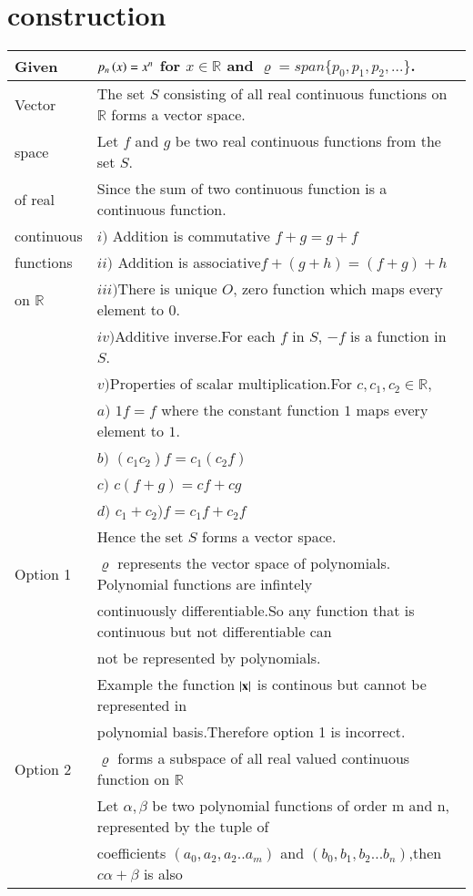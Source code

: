 \documentclass[journal,12pt]{IEEEtran}
\begin{document}
\section{construction}
\renewcommand{\thetable}{1}
\begin{longtable}{|l|l|}
    \hline
    Given & $p_n\left(x\right)=x^n$ for $x\in\mathbb{R}$ and $\varrho=span\{p_0,p_1,p_2,...\}$.\\
    \hline
    Vector& The set $S$ consisting of all real continuous functions on $\mathbb{R}$ forms a vector space.\\
    space&Let $f$ and $g$ be two real continuous functions from the set $S$.\\
    of real&Since the sum of two continuous function is a continuous function.\\
    continuous&$i)$ Addition is commutative $f+g=g+f$\\
    functions&$ii)$ Addition is associative$f+(g+h)=(f+g)+h$\\
    on $\mathbb{R}$&$iii)$There is unique $O$, zero function which maps every element to 0.\\
    &$iv)$Additive inverse.For each $f$ in $S$, $-f$ is a function in $S$.\\
    &$v)$Properties of scalar multiplication.For $c,c_1,c_2\in \mathbb{R}$,\\
    &\qquad $a)$ $1f=f$ where the constant function $1$ maps every element to $1$.\\
    &\qquad $b)$ $(c_1c_2)f=c_1(c_2f)$\\
    &\qquad $c)$ $c(f+g)=cf+cg$\\
    &\qquad $d)$ $c_1+c_2)f=c_1f+c_2f$\\
    &Hence the set $S$ forms a vector space.\\
    \hline
    Option 1& $\varrho$ represents the vector space of polynomials. Polynomial functions are infintely \\
    & continuously differentiable.So any function that is continuous but not differentiable can \\
    & not be represented by polynomials.\\
    & Example the function $\mathbf{\left\vert x\right\vert}$ is continous but cannot be represented in \\
    &polynomial basis.Therefore option 1 is incorrect.\\
    \hline
    Option 2& $\varrho$ forms a subspace of all real valued continuous function on $\mathbb{R}$\\
    &Let $\alpha,\beta$ be two polynomial functions of order m and n, represented by the tuple of\\ &coefficients $(a_0,a_2,a_2..a_m)$ and $(b_0,b_1,b_2...b_n)$,then $c\alpha+\beta$ is also\\

\end{longtable}
\end{document}
